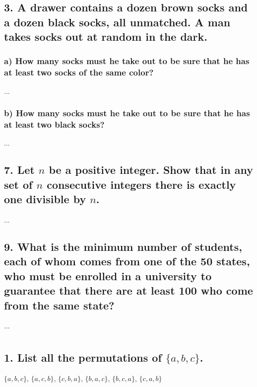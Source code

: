 \documentclass[11pt, oneside]{article} %
\numberwithin{equation}{section} %
\numberwithin{figure}{section} %
\numberwithin{table}{section} %
\begin{document}

\subsection{3. A drawer contains a dozen brown socks and a dozen black socks, all unmatched. A man takes socks out at random in the dark.}
\subsubsection{a) How many socks must he take out to be sure that he
has at least two socks of the same color?}
...

\subsubsection{b) How many socks must he take out to be sure that he has at least two black socks?}
...

\subsection{7. Let $n$ be a positive integer. Show that in any set of $n$ consecutive integers there is exactly one divisible by $n$.}
...

\subsection{9. What is the minimum number of students, each of whom comes from one of the 50 states, who must be enrolled in a university to guarantee that there are at least 100 who come from the same state?}
...

\section{}
\subsection{1. List all the permutations of $\{a, b, c\}$.}
$\{a, b, c\}$, $\{a, c, b\}$, $\{c, b, a\}$, $\{b, a, c\}$, $\{b, c, a\}$, $\{c, a, b\}$ 

\end{document}
